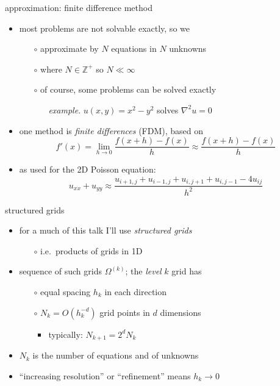 \documentclass[hide notes,intlimits,usenames,dvipsnames]{beamer}
\newcommand{\ZZ}{\mathbb{Z}}
\newcommand{\grad}{\nabla}
\begin{document}
\begin{frame}{approximation: finite difference method}
\begin{itemize}
\item most problems are not solvable exactly, so we
	\begin{itemize}
	\item[$\circ$] \alert{approximate by $N$ equations in $N$ unknowns}
	\item[$\circ$] where $N\in\ZZ^+$ so $N \ll \infty$

    \smallskip
	\item[$\circ$] of course, some problems can be solved exactly
        \begin{itemize}
        \item[\emph{example}.]  $u(x,y)=x^2-y^2$ solves $\grad^2 u = 0$
        \end{itemize}
	\end{itemize}
\item one method is \emph{finite differences} (FDM), based on
	    $$f'(x) = \lim_{h \to 0} \frac{f(x+h)-f(x)}{h} \approx \frac{f(x+h)-f(x)}{h}$$
\item as used for the 2D Poisson equation:
	    $$u_{xx}+u_{yy} \approx \frac{u_{i+1,j} + u_{i-1,j} + u_{i,j+1} + u_{i,j-1} - 4 u_{ij}}{h^2}$$
\end{itemize}
\end{frame}


\begin{frame}{structured grids}
\begin{itemize}
\item for a much of this talk I'll use \emph{structured grids}
	\begin{itemize}
	\item[$\circ$] i.e.~products of grids in 1D
	\end{itemize}
\item sequence of such grids $\Omega^{(k)}$; the \emph{level} $k$ grid has
	\begin{itemize}
	\item[$\circ$] equal spacing $h_k$ in each direction
    \item[$\circ$] $N_k = O(h_k^{-d})$ grid points in $d$ dimensions
	    \begin{itemize}
	    \item typically: $N_{k+1} = 2^d N_k$
	    \end{itemize}
	\end{itemize}

\bigskip
\begin{tikzpicture}[scale=1.6]

\end{tikzpicture}

\medskip
\item $N_k$ is the number of equations and of unknowns
\item ``increasing resolution'' or ``refinement'' means $h_k \to 0$
\end{itemize}
\end{frame}
\end{document}
